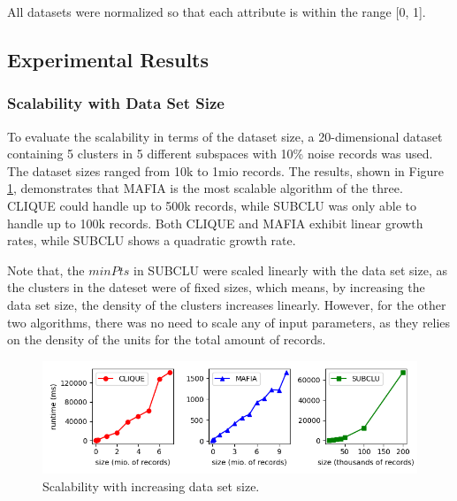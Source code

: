 All datasets were normalized so that each attribute is within the range [0, 1].

\subsection{Experimental Results}

\subsubsection{Scalability with Data Set Size}
To evaluate the scalability in terms of the dataset size, a 20-dimensional dataset containing 5 clusters in 5 different subspaces with 10\% noise records was used. The dataset sizes ranged from 10k to 1mio records. The results, shown in Figure \ref{fig:dataset_size_vs_runtime}, demonstrates that MAFIA is the most scalable algorithm of the three. CLIQUE could handle up to 500k records, while SUBCLU was only able to handle up to 100k records. Both CLIQUE and MAFIA exhibit linear growth rates, while SUBCLU shows a quadratic growth rate.

Note that, the $minPts$ in SUBCLU were scaled linearly with the data set size, as the clusters in the dateset were of fixed sizes, which means, by increasing the data set size, the density of the clusters increases linearly. However, for the other two algorithms, there was no need to scale any of input parameters, as they relies on the density of the units for the total amount of records.
\begin{figure}[H]
    \vspace*{-0.6cm}
    \centering
    \includegraphics[scale=0.5]{figures/dataset_size_vs_runtime.png}
    \caption{Scalability with increasing data set size.}
    \label{fig:dataset_size_vs_runtime}
    \vspace*{-0.6cm}
\end{figure}

